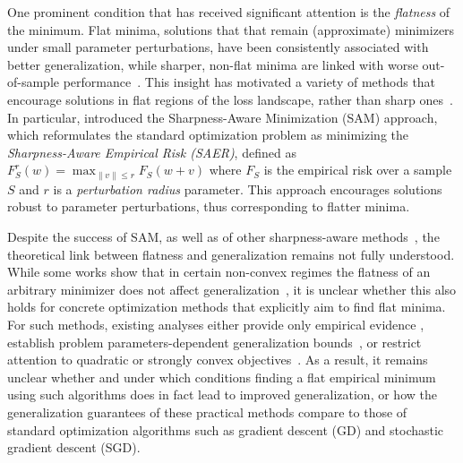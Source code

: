 \documentclass[11pt]{article}
\newcommand{\fsmax}{F_S^{\rad}}
\newcommand{\rad}{r}
\begin{document}
One prominent condition that has received significant attention is the \emph{flatness} of the minimum. Flat minima, solutions that that remain (approximate) minimizers under small parameter perturbations, have been consistently associated with better generalization, while sharper, non-flat minima are linked with worse out-of-sample performance~\citep{keskar2016large,dziugaite2018entropy,jiang2019fantastic,singh2025avoiding}. This insight has motivated a variety of methods that encourage solutions in flat regions of the loss landscape, rather than sharp ones~\citep{wu2020adversarial,foret2021sharpness,kwon2021asam,zheng2021regularizing,du2021efficient,kim2022fisher,zhuang2022surrogate,liu2022towards,du2022sharpness,zhao2022randomized,andriushchenko2023sharpness,li2023enhancing,jiang2023adaptive, xie2024sampa,tahmasebi2024universal,li2024friendly}.
In particular, \citet{foret2021sharpness} introduced the Sharpness-Aware Minimization (SAM) approach, which reformulates the standard optimization problem as minimizing the \emph{Sharpness-Aware Empirical Risk (SAER)}, defined as 
$
    \fsmax(w) =
    \max_{\|v\| \leq \rad} F_S(w + v)
$
where $F_S$ is the empirical risk over a sample $S$ and $\rad$ is a \emph{perturbation radius} parameter. This approach encourages solutions robust to parameter perturbations, thus corresponding to flatter minima.

Despite the success of SAM, as well as of other sharpness-aware methods~\citep{bahri2021sharpness,chen2021vision,foret2021sharpness,kaddour2022flat,lee2023plastic}, 
the theoretical link between flatness and generalization remains not fully understood. 
While some works show that in certain non-convex regimes the flatness 
of an arbitrary minimizer does not affect generalization~\citep[e.g.,][]{dinh2017sharp,wen2023sharpness}, it is unclear whether this also holds for concrete optimization methods that explicitly aim to find flat minima. For such methods, existing analyses either provide only empirical evidence 
\citep{andriushchenko2023modern,wen2023sharpness,ramasinghe2023much}, establish problem parameters-dependent generalization 
bounds~\citep{neyshabur2017exploring,wei2019data,wei2019improved,foret2021sharpness,norton2023diametrical}, or restrict attention to quadratic or strongly convex objectives~\citep{chen2024does,tan2025stabilizing}. 
As a result, it remains unclear whether and under which conditions finding a flat empirical minimum using such 
algorithms does in fact lead to improved generalization, or how the generalization guarantees of these practical methods compare to those of standard optimization algorithms such as gradient descent (GD) and stochastic gradient descent (SGD).
\end{document}

